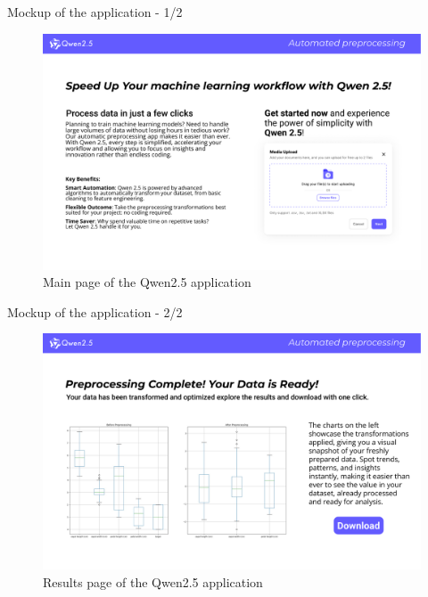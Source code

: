 \documentclass{beamer}
\begin{document}
\begin{frame}{Mockup of the application - 1/2}
    \vspace{0.2cm}
    \begin{figure}
        \centering
        \includegraphics[width=\textwidth]{App_prototipo_1.pdf}
        \caption{Main page of the Qwen2.5 application} 
    \end{figure}
\end{frame}

\begin{frame}{Mockup of the application - 2/2}
    \vspace{0.2cm}
    \begin{figure}
        \centering
        \includegraphics[width=\textwidth]{App_prototipo_2.pdf}
        \caption{Results page of the Qwen2.5 application}
    \end{figure}
\end{frame}
\end{document}
